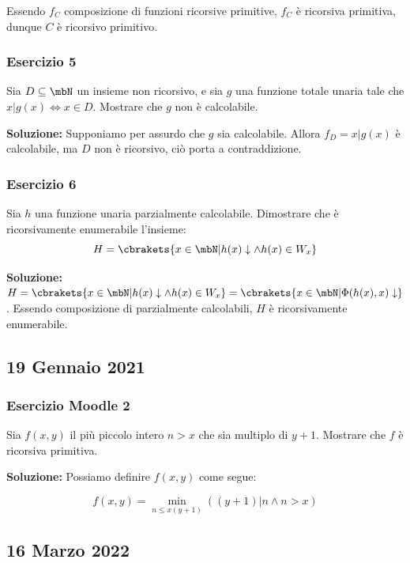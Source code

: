 Essendo \(f_C\) composizione di funzioni ricorsive primitive, \(f_C\) è ricorsiva primitiva, dunque \(C\) è ricorsivo primitivo.

\subsubsection{Esercizio 5}

Sia \(D\subseteq \mbN\) un insieme non ricorsivo, e sia \(g\) una funzione totale unaria tale che \(x \vert g(x) \iff x \in D\). Mostrare che \(g\) non è calcolabile.

\textbf{Soluzione: } Supponiamo per assurdo che \(g\) sia calcolabile. Allora \(f_D=x\vert g(x)\) è calcolabile, ma \(D\) non è ricorsivo, ciò porta a contraddizione.

\subsubsection{Esercizio 6}

Sia \(h\) una funzione unaria parzialmente calcolabile. Dimostrare che è ricorsivamente enumerabile l'insieme:
\begin{equation}
  H=\cbrakets{x \in \mbN \vert h(x) \downarrow \land h(x) \in W_x}
\end{equation}

\textbf{Soluzione: } \(H=\cbrakets{x \in \mbN \vert h(x) \downarrow \land h(x) \in W_x}=\cbrakets{x \in \mbN \vert \Phi(h(x),x) \downarrow}\). Essendo composizione di parzialmente calcolabili, \(H\) è ricorsivamente enumerabile.

\subsection{19 Gennaio 2021}

\subsubsection{Esercizio Moodle 2}

Sia \(f(x,y)\) il più piccolo intero \(n>x\) che sia multiplo di \(y+1\). Mostrare che \(f\) è ricorsiva primitiva.

\textbf{Soluzione: } Possiamo definire \(f(x,y)\) come segue:

\begin{equation}
  f(x,y)= \min_{n\leq x(y+1)} ( (y+1) \vert n \land n > x)
\end{equation}

\subsection{16 Marzo 2022}

